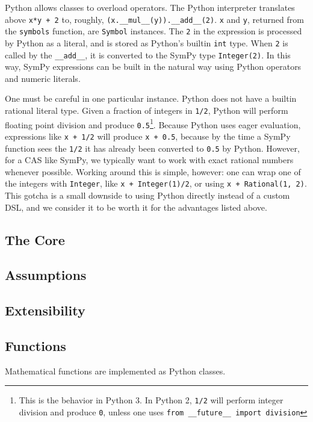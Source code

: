 Python allows classes to overload operators. The Python interpreter translates
above \texttt{x*y + 2} to, roughly,
\verb|(x.__mul__(y)).__add__(2)|. \texttt{x} and \texttt{y}, returned from
the \texttt{symbols} function, are \texttt{Symbol} instances. The \texttt{2}
in the expression is processed by Python as a literal, and is stored as
Python's builtin \texttt{int} type. When \texttt{2} is called by the
\verb|__add__|, it is converted to the SymPy type \texttt{Integer(2)}. In
this way, SymPy expressions can be built in the natural way using Python
operators and numeric literals.

One must be careful in one particular instance. Python does not have a builtin
rational literal type. Given a fraction of integers in \texttt{1/2}, Python
will perform floating point division and produce \texttt{0.5}\footnote{This is
  the behavior in Python 3. In Python 2, \texttt{1/2} will perform integer
  division and produce \texttt{0}, unless one uses \texttt{from \_\_future\_\_
    import division}}. Because Python uses eager evaluation, expressions like
\texttt{x + 1/2} will produce \texttt{x + 0.5}, because by the time a SymPy
function sees the \texttt{1/2} it has already been converted to \texttt{0.5}
by Python. However, for a CAS like SymPy, we typically want to work with exact
rational numbers whenever possible. Working around this is simple, however:
one can wrap one of the integers with \texttt{Integer}, like \texttt{x +
  Integer(1)/2}, or using \texttt{x + Rational(1, 2)}. This gotcha is a small
downside to using Python directly instead of a custom DSL, and we consider it
to be worth it for the advantages listed above.

\subsection{The Core}

\subsection{Assumptions}

\subsection{Extensibility}

\subsection{Functions}

Mathematical functions are implemented as Python classes.


